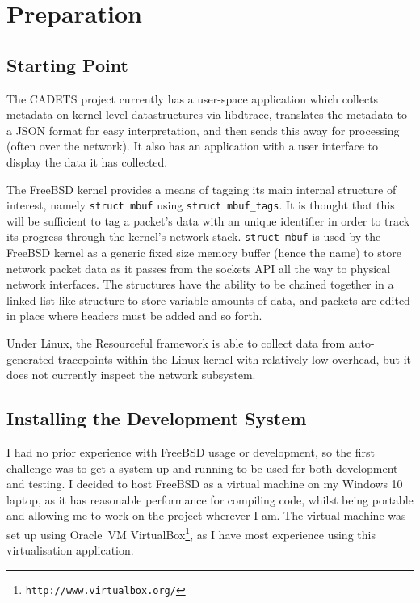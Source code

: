 \documentclass[a4paper,12pt,twoside,openright]{report}
\begin{document}
	
	
	\chapter{Preparation}
	
	\section{Starting Point}
	
	The CADETS project currently has a user-space application which collects metadata on kernel-level	datastructures via libdtrace, translates the metadata to a JSON format for easy interpretation, and	then sends this away for processing (often over the network). It also has an application with a user interface to display the data it has collected.
	
	The FreeBSD kernel provides a means of tagging its main internal structure of interest, namely \verb|struct mbuf| using \verb|struct mbuf_tags|. It is thought that this will be sufficient to tag a packet’s data with an unique identifier in order to track its progress through the kernel’s network stack. \verb|struct mbuf| is used by the FreeBSD kernel as a generic fixed size memory buffer (hence the name) to store network packet data as it passes from the sockets API all the way to physical network interfaces. The structures have the ability to be chained together in a linked-list like structure to store variable amounts of data, and packets are edited in place where headers must be added and so forth.
	
	Under Linux, the Resourceful framework is able to collect data from auto-generated tracepoints	within the Linux kernel with relatively low overhead, but it does not currently inspect the network subsystem.
	
	\section{Installing the Development System}
	
	I had no prior experience with FreeBSD usage or development, so the first challenge was to get a system up and running to be used for both development and testing. I decided to host FreeBSD as a virtual machine on my Windows 10 laptop, as it has reasonable performance for compiling code, whilst being portable and allowing me to work on the project wherever I am. The virtual machine was set up using Oracle\texttrademark\ VM VirtualBox\footnote{\texttt{http://www.virtualbox.org/}}, as I have most experience using this virtualisation application.
	
\end{document}
